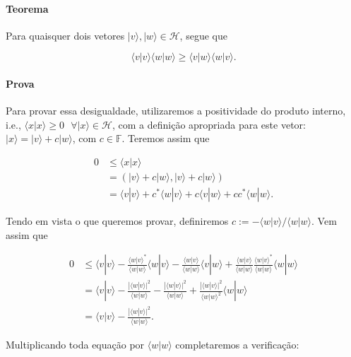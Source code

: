 \documentclass[11pt]{article}
\begin{document}
\paragraph{Teorema}\label{teorema}

Para quaisquer dois vetores \(|v\rangle,|w\rangle\in\mathcal{H}\), segue
que

\begin{equation}
\langle v|v\rangle\langle w|w\rangle \ge \langle v|w\rangle\langle w|v\rangle.
\end{equation}

\paragraph{Prova}\label{prova}

Para provar essa desigualdade, utilizaremos a positividade do produto
interno, i.e.,
\(\langle x|x\rangle\ge 0\text{ }\forall|x\rangle\in\mathcal{H}\), com a
definição apropriada para este vetor:
\(|x\rangle=|v\rangle+c|w\rangle\), com \(c\in\mathbb{F}\). Teremos
assim que

\begin{align}
0 & \le \langle x|x\rangle \\
& = (|v\rangle+c|w\rangle,|v\rangle+c|w\rangle) \\
& = \langle v|v\rangle + c^{*}\langle w|v\rangle + c\langle v|w\rangle + cc^{*}\langle w|w\rangle. 
\end{align}

Tendo em vista o que queremos provar, definiremos
\(c:=-\langle w|v\rangle/\langle w|w\rangle\). Vem assim que

\begin{align}
0 & \le \langle v|v\rangle - \frac{\langle w|v\rangle^{*}}{\langle w|w\rangle}\langle w|v\rangle - \frac{\langle w|v\rangle}{\langle w|w\rangle}\langle v|w\rangle + \frac{\langle w|v\rangle}{\langle w|w\rangle}\frac{\langle w|v\rangle^{*}}{\langle w|w\rangle}\langle w|w\rangle \\
& = \langle v|v\rangle - \frac{|\langle w|v\rangle|^{2}}{\langle w|w\rangle} - \frac{|\langle w|v\rangle|^{2}}{\langle w|w\rangle} + \frac{|\langle w|v\rangle|^{2}}{\langle w|w\rangle^{2}}\langle w|w\rangle \\
& = \langle v|v\rangle - \frac{|\langle w|v\rangle|^{2}}{\langle w|w\rangle}.
\end{align}

Multiplicando toda equação por \(\langle w|w\rangle\) completaremos a
verificação:
\end{document}
